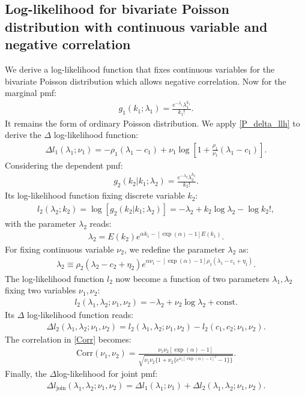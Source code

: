 \documentclass[submission, Phys]{SciPost}
\begin{document}
\begin{appendix}
\subsection{Log-likelihood for bivariate Poisson distribution with continuous variable and negative correlation}
We derive a log-likelihood function that fixes continuous variables for the bivariate Poisson distribution which allows negative correlation. Now for the marginal pmf:
\begin{align}
g_{1}(k_{1};\lambda_1)=\frac{e^{-\lambda_{1}}\lambda_{1}^{k_{1}}}{k_{1}!}.
\end{align}
It remains the form of ordinary Poisson distribution. We apply \ref{P_delta_llh} to derive the $\Delta$ log-likelihood function:
\begin{align}
\Delta l_1(\lambda_1;\nu_1) = -\rho_1(\lambda_1-c_{1}) + \nu_1\log\left[1+\frac{\rho_1}{\nu_1}(\lambda_1-c_1)\right].
\end{align}
Considering the dependent pmf:
\begin{align}
g_{2}(k_{2}|k_{1};\lambda_2)=\frac{e^{-\lambda_{2}}\lambda_{2}^{k_{2}}}{k_{2}!}.
\end{align}   
Its log-likelihood function fixing discrete variable $k_2$:
\begin{align}
l_2(\lambda_2; k_2) = \log [g_{2}(k_{2}|k_{1};\lambda_2)]=-\lambda_2 + k_2\log \lambda_2 - \log k_2!,
\end{align}
with the parameter $\lambda_2$ reads:
\begin{align}
\lambda_2 = E(k_2)e^{\alpha k_1 - [\exp(\alpha)-1]E(k_1)}.
\end{align}
For fixing continuous variable $\nu_2$, we redefine the parameter $\lambda_2$ as:
\begin{align}
\lambda_2 \equiv \rho_2(\lambda_2 - c_2 + \eta_2)e^{\alpha \nu_1 - [\exp(\alpha)-1]\rho_1(\lambda_1-c_1+\eta_1)}.
\end{align}
The log-likelihood function $l_2$ now become a function of two parameters $\lambda_1, \lambda_2$ fixing two variables $\nu_1, \nu_2$:
\begin{align}
l_2(\lambda_1,\lambda_2; \nu_1,\nu_2) =-\lambda_2 + \nu_2\log \lambda_2 + \text{const}.
\end{align}
Its $\Delta$ log-likelihood function reads:
\begin{align}
\Delta l_2(\lambda_1,\lambda_2; \nu_1,\nu_2)=l_2(\lambda_1,\lambda_2; \nu_1,\nu_2)-l_2(c_1,c_2; \nu_1,\nu_2).
\end{align}
The correlation in \ref{Corr} becomes: 
\begin{align}
\text{Corr}(\nu_1,\nu_2) = \frac{\nu_1\nu_2[\exp(\alpha)-1]}{\sqrt{\nu_1\nu_2\{1+\nu_2\{e^{\nu_1[\exp(\alpha)-1]^2}-1\}\}}}.
\end{align}
Finally, the $\Delta$log-likelihood for joint pmf:
\begin{align}
\Delta l_{\text{join}}(\lambda_1,\lambda_2;\nu_1,\nu_2)=\Delta l_1(\lambda_1;\nu_1) + \Delta l_2(\lambda_1,\lambda_2; \nu_1,\nu_2).
\end{align}
\end{appendix}
\end{document}

